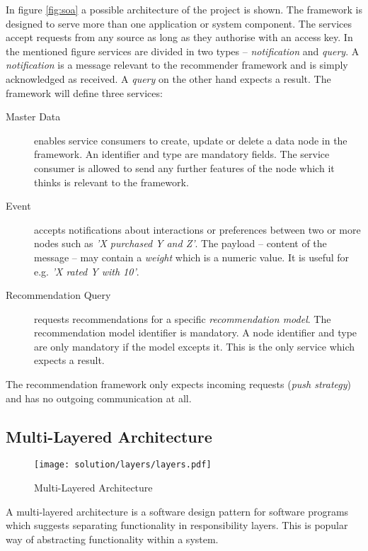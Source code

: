 In figure \ref{fig:soa} a possible architecture of the project is shown. The framework is designed to serve more than one application or system component. The services accept requests from any source as long as they authorise with an access key. In the mentioned figure services are divided in two types -- \emph{notification} and \emph{query}. A \emph{notification} is a message relevant to the recommender framework and is simply acknowledged as received. A \emph{query} on the other hand expects a result. The framework will define three services:

\begin{description}
    \item[Master Data] enables service consumers to create, update or delete a data node in the framework. An identifier and type are mandatory fields. The service consumer is allowed to send any further features of the node which it thinks is relevant to the framework.
    \item[Event] accepts notifications about interactions or preferences between two or more nodes such as \emph{'X purchased Y and Z'}. The payload -- content of the message -- may contain a \emph{weight} which is a numeric value. It is useful for e.g. \emph{'X rated Y with 10'}.
    \item[Recommendation Query] requests recommendations for a specific \emph{recommendation model}. The recommendation model identifier is mandatory. A node identifier and type are only mandatory if the model excepts it. This is the only service which expects a result.
\end{description}

The recommendation framework only expects incoming requests (\emph{push strategy}) and has no outgoing communication at all.

\subsection{Multi-Layered Architecture}
\label{sol-design-layer}

\begin{figure}[ht]
    \texttt{[image: solution/layers/layers.pdf]}
    \caption{Multi-Layered Architecture}
    \label{fig:layers}
\end{figure}

A multi-layered architecture is a software design pattern for software programs which suggests separating functionality in responsibility layers. This is popular way of abstracting functionality within a system.


